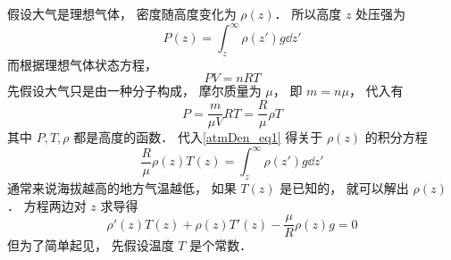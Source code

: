 
假设大气是理想气体， 密度随高度变化为 $\rho(z)$． 所以高度 $z$ 处压强为
\begin{equation}\label{atmDen_eq1}
P(z) = \int_{z}^\infty \rho(z') g \dd{z'}
\end{equation}
而根据理想气体状态方程，
\begin{equation}
PV = n R T
\end{equation}
先假设大气只是由一种分子构成， 摩尔质量为 $\mu$， 即 $m = n\mu$， 代入有
\begin{equation}
P = \frac{m}{\mu V} RT = \frac{R}{\mu} \rho T
\end{equation}
其中 $P, T, \rho$ 都是高度的函数． 代入\autoref{atmDen_eq1} 得关于 $\rho(z)$ 的积分方程
\begin{equation}
\frac{R}{\mu} \rho(z) T(z) = \int_{z}^\infty \rho(z') g \dd{z'}
\end{equation}
通常来说海拔越高的地方气温越低， 如果 $T(z)$ 是已知的， 就可以解出 $\rho(z)$． 方程两边对 $z$ 求导得
\begin{equation}
\rho'(z) T(z) + \rho(z) T'(z) - \frac{\mu}{R}\rho(z) g = 0
\end{equation}
但为了简单起见， 先假设温度 $T$ 是个常数．
